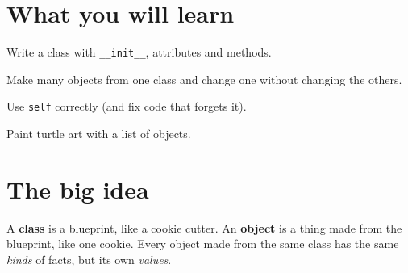 
\section{What you will learn}
\begin{checklist}
  \item Write a class with \texttt{\_\_init\_\_}, attributes and methods.
  \item Make many objects from one class and change one without changing the others.
  \item Use \texttt{self} correctly (and fix code that forgets it).
  \item Paint turtle art with a list of objects.
\end{checklist}

\section{The big idea}
A \textbf{class} is a blueprint, like a cookie cutter. An \textbf{object} is a thing made from the blueprint, like one cookie. Every object made from the same class has the same \emph{kinds} of facts, but its own \emph{values}.

